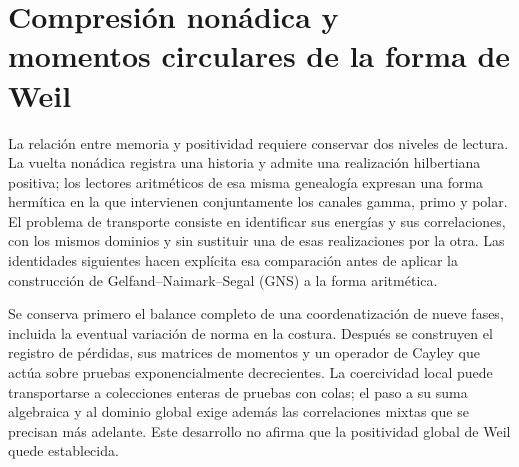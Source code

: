 \clearpage
\section[Compresión nonádica y momentos circulares de la forma de Weil]{Compresión nonádica y\\momentos circulares de la forma de Weil}
\label{sec:transporte-momentos}
\label{tm-add-seccion}

La relación entre memoria y positividad requiere conservar dos niveles de lectura.
La vuelta nonádica registra una historia y admite una realización hilbertiana
positiva; los lectores aritméticos de esa misma genealogía expresan una forma
hermítica en la que intervienen conjuntamente los canales gamma, primo y polar.
El problema de transporte consiste en identificar sus energías y sus correlaciones,
con los mismos dominios y sin sustituir una de esas realizaciones por la otra.
Las identidades siguientes hacen explícita esa comparación antes de aplicar
la construcción de Gelfand--Naimark--Segal (GNS) a la forma aritmética.

Se conserva primero el balance completo de una coordenatización de nueve fases, incluida
la eventual variación de norma en la costura. Después se construyen el registro
de pérdidas, sus matrices de momentos y un operador de Cayley que actúa sobre
pruebas exponencialmente decrecientes. La coercividad local puede transportarse
a colecciones enteras de pruebas con colas; el paso a su suma algebraica y al dominio
global exige además las correlaciones mixtas que se precisan más adelante.
Este desarrollo no afirma que la positividad global de Weil quede establecida.

% 
% 
% 
% 

